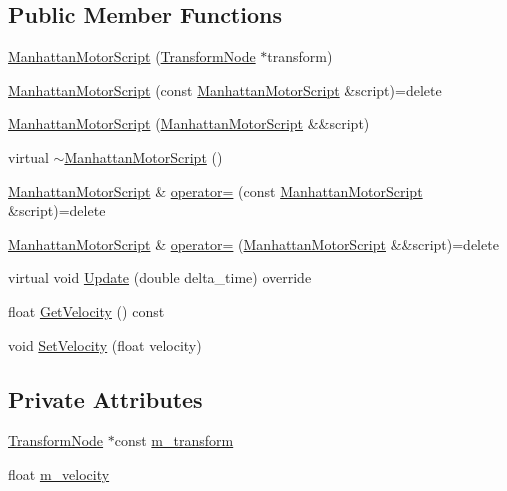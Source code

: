 \subsection*{Public Member Functions}
\begin{DoxyCompactItemize}
\item 
\hyperlink{classmage_1_1_manhattan_motor_script_a6a40360d3b1603e8e5fc64a230ed7574}{Manhattan\+Motor\+Script} (\hyperlink{classmage_1_1_transform_node}{Transform\+Node} $\ast$transform)
\item 
\hyperlink{classmage_1_1_manhattan_motor_script_a890f4456d4707e6eb33e43837b26e536}{Manhattan\+Motor\+Script} (const \hyperlink{classmage_1_1_manhattan_motor_script}{Manhattan\+Motor\+Script} \&script)=delete
\item 
\hyperlink{classmage_1_1_manhattan_motor_script_ae573b594372f184a524c6c9f35517fae}{Manhattan\+Motor\+Script} (\hyperlink{classmage_1_1_manhattan_motor_script}{Manhattan\+Motor\+Script} \&\&script)
\item 
virtual \hyperlink{classmage_1_1_manhattan_motor_script_a86d4f8c4ba0aa94358ea2bc77f9a2a69}{$\sim$\+Manhattan\+Motor\+Script} ()
\item 
\hyperlink{classmage_1_1_manhattan_motor_script}{Manhattan\+Motor\+Script} \& \hyperlink{classmage_1_1_manhattan_motor_script_a563d4d429bbcabf25f57539857dde53c}{operator=} (const \hyperlink{classmage_1_1_manhattan_motor_script}{Manhattan\+Motor\+Script} \&script)=delete
\item 
\hyperlink{classmage_1_1_manhattan_motor_script}{Manhattan\+Motor\+Script} \& \hyperlink{classmage_1_1_manhattan_motor_script_a944149dc06764bc23feffde4de100679}{operator=} (\hyperlink{classmage_1_1_manhattan_motor_script}{Manhattan\+Motor\+Script} \&\&script)=delete
\item 
virtual void \hyperlink{classmage_1_1_manhattan_motor_script_aa2aee651ef777e71ac8da8345f86b212}{Update} (double delta\+\_\+time) override
\item 
float \hyperlink{classmage_1_1_manhattan_motor_script_a420ed8a511a6f404056a31245bb7bed0}{Get\+Velocity} () const
\item 
void \hyperlink{classmage_1_1_manhattan_motor_script_a9a21c42e1998dfe18b05d00011db7e7f}{Set\+Velocity} (float velocity)
\end{DoxyCompactItemize}
\subsection*{Private Attributes}
\begin{DoxyCompactItemize}
\item 
\hyperlink{classmage_1_1_transform_node}{Transform\+Node} $\ast$const \hyperlink{classmage_1_1_manhattan_motor_script_a87af31ce6376830ed040b19d78da386e}{m\+\_\+transform}
\item 
float \hyperlink{classmage_1_1_manhattan_motor_script_a824893c374fa6f271a964751dc1a59ec}{m\+\_\+velocity}
\end{DoxyCompactItemize}

